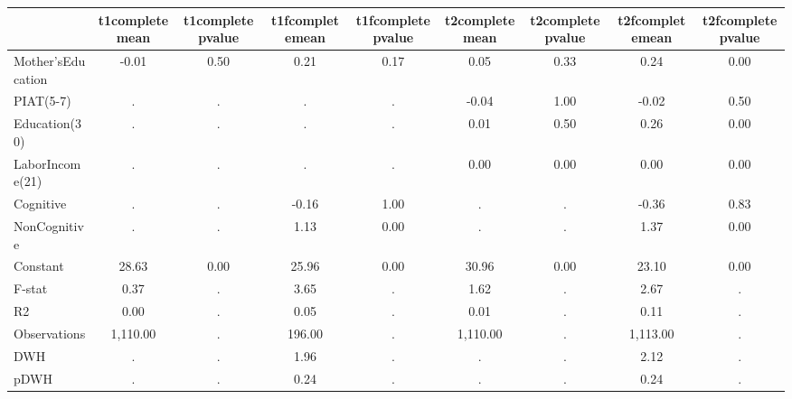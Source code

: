 \begin{table}[htbp]
\begin{tabular}{lcccccccc} \hline \hline
 & t1completemean  & t1completepvalue  & t1fcompletemean  & t1fcompletepvalue  & t2completemean  & t2completepvalue  & t2fcompletemean  & t2fcompletepvalue  \\  \hline 
Mother'sEducation &        -0.01 &         0.50 &         0.21 &         0.17 &         0.05 &         0.33 &         0.24 &         0.00 \\  
PIAT(5-7) &            . &            . &            . &            . &        -0.04 &         1.00 &        -0.02 &         0.50 \\  
Education(30) &            . &            . &            . &            . &         0.01 &         0.50 &         0.26 &         0.00 \\  
LaborIncome(21) &            . &            . &            . &            . &         0.00 &         0.00 &         0.00 &         0.00 \\  
Cognitive &            . &            . &        -0.16 &         1.00 &            . &            . &        -0.36 &         0.83 \\  
NonCognitive &            . &            . &         1.13 &         0.00 &            . &            . &         1.37 &         0.00 \\  
Constant &        28.63 &         0.00 &        25.96 &         0.00 &        30.96 &         0.00 &        23.10 &         0.00 \\  
F-stat &         0.37 &            . &         3.65 &            . &         1.62 &            . &         2.67 &            . \\  
R2 &         0.00 &            . &         0.05 &            . &         0.01 &            . &         0.11 &            . \\  
Observations &     1,110.00 &            . &       196.00 &            . &     1,110.00 &            . &     1,113.00 &            . \\  
DWH &            . &            . &         1.96 &            . &            . &            . &         2.12 &            . \\  
pDWH &            . &            . &         0.24 &            . &            . &            . &         0.24 &            . \\  
\hline \hline \end{tabular}
\end{table}
